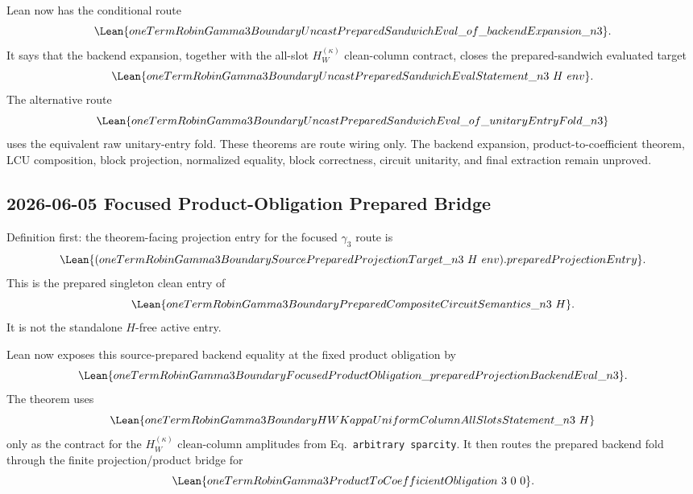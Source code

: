 Lean now has the conditional route
\[
  \Lean{oneTermRobinGamma3BoundaryUncastPreparedSandwichEval\_of\_backendExpansion\_n3}.
\]
It says that the backend expansion, together with the all-slot
\(H_W^{(\kappa)}\) clean-column contract, closes the prepared-sandwich
evaluated target
\[
  \Lean{oneTermRobinGamma3BoundaryUncastPreparedSandwichEvalStatement\_n3\ H\ env}.
\]
The alternative route
\[
  \Lean{oneTermRobinGamma3BoundaryUncastPreparedSandwichEval\_of\_unitaryEntryFold\_n3}
\]
uses the equivalent raw unitary-entry fold.  These theorems are route wiring
only.  The backend expansion, product-to-coefficient theorem, LCU composition,
block projection, normalized equality, block correctness, circuit unitarity,
and final extraction remain unproved.

\subsection{2026-06-05 Focused Product-Obligation Prepared Bridge}

Definition first: the theorem-facing projection entry for the focused
\(\gamma_3\) route is
\[
  \Lean{(oneTermRobinGamma3BoundarySourcePreparedProjectionTarget\_n3\ H\ env).preparedProjectionEntry}.
\]
This is the prepared singleton clean entry of
\[
  \Lean{oneTermRobinGamma3BoundaryPreparedCompositeCircuitSemantics\_n3\ H}.
\]
It is not the standalone \(H\)-free active entry.

Lean now exposes this source-prepared backend equality at the fixed product
obligation by
\[
  \Lean{oneTermRobinGamma3BoundaryFocusedProductObligation\_preparedProjectionBackendEval\_n3}.
\]
The theorem uses
\[
  \Lean{oneTermRobinGamma3BoundaryHWKappaUniformColumnAllSlotsStatement\_n3\ H}
\]
only as the contract for the \(H_W^{(\kappa)}\) clean-column amplitudes from
Eq.~\texttt{arbitrary sparcity}.  It then routes the prepared backend fold
through the finite projection/product bridge for
\[
  \Lean{oneTermRobinGamma3ProductToCoefficientObligation\ 3\ 0\ 0}.
\]

